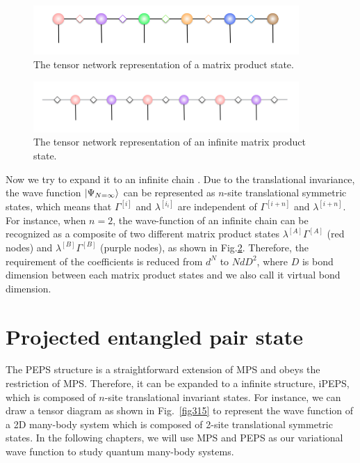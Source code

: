 \begin{figure}[t]
	\centering
	\includegraphics[width=0.90\textwidth]{figures/fig3111.png}
	\caption[The tensor network representation of matrix product states]{The tensor network representation of a matrix product state.}
	\label{fig311}
\end{figure}

\begin{figure}[t]
	\centering
	\includegraphics[width=0.90\textwidth]{figures/fig311.png}
	\caption[The tensor network representation of infinite matrix product states]{The tensor network representation of an infinite matrix product state.}
	\label{fig312}
\end{figure}

Now we try to expand it to an infinite chain \cite{PhysRevLett.98.070201}. Due to the translational invariance, the wave function $\Ket{\Psi_{N=\infty}}$ can be represented as $n$-site translational symmetric states, which means that $\Gamma^{[i]}$ and $\lambda^{[i_{i}]}$ are independent of $\Gamma^{[i+n]}$ and $\lambda^{[i+n]}$. For instance, when $n=2$, the wave-function of an infinite chain can be recognized as a composite of two different matrix product states $\lambda^{[A]}\Gamma^{[A]}$ (red nodes) and $\lambda^{[B]}\Gamma^{[B]}$ (purple nodes), as shown in Fig.\ref{fig312}. Therefore, the requirement of the coefficients is reduced from $d^N$ to $NdD^2$, where $D$ is bond dimension between each matrix product states and we also call it virtual bond dimension. 
\section{Projected entangled pair state}

The PEPS structure is a straightforward extension of MPS and obeys the restriction of MPS. Therefore, it can be expanded to a infinite structure, iPEPS, which is composed of $n$-site translational invariant states. For instance, we can draw a tensor diagram as shown in Fig.~\ref{fig315} to represent the wave function of a 2D many-body system which is composed of 2-site translational symmetric states. In the following chapters, we will use MPS and PEPS as our variational wave function to study quantum many-body systems.

